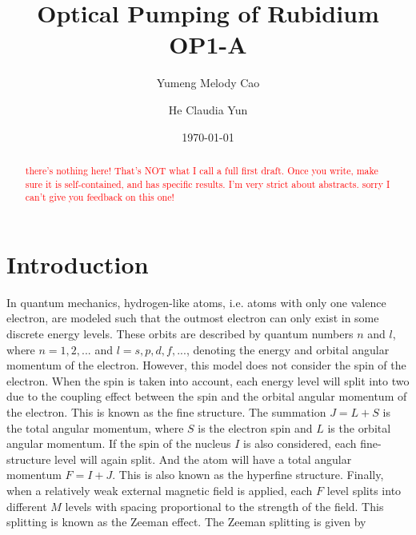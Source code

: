 \documentclass[prb,preprint]{revtex4-1}
\begin{document}
\title{Optical Pumping of Rubidium OP1-A}

\author{Yumeng Melody Cao}
\author{He Claudia Yun}


\date{\today}


\begin{abstract}
\textcolor{red}{there's nothing here! That's NOT what I call a full first draft. Once you write, make sure it is self-contained, and has specific results. I'm very strict about abstracts. sorry I can't give you feedback on this one! }
\end{abstract}

\maketitle 

\section{Introduction}


In quantum mechanics, hydrogen-like atoms, i.e. atoms with only one valence electron, are modeled such that the outmost electron can only exist in some discrete energy levels. These orbits are described by quantum numbers $n$ and $l$, where $n=1, 2, ...$ and $l=s, p, d, f, ...$, denoting the energy and orbital angular momentum of the electron. However, this model does not consider the spin of the electron. When the spin is taken into account, each energy level will split into two due to the coupling effect between the spin and the orbital angular momentum of the electron. This is known as the fine structure. The summation $J=L+S$ is the total angular momentum, where $S$ is the electron spin and $L$ is the orbital angular momentum. If the spin of the nucleus $I$ is also considered, each fine-structure level will again split. And the atom will have a total angular momentum $F=I+J$. This is also known as the hyperfine structure. Finally, when a relatively weak external magnetic field is applied, each $F$ level splits into different $M$ levels with spacing proportional to the strength of the field. This splitting is known as the Zeeman effect. The Zeeman splitting is given by
\end{document}
